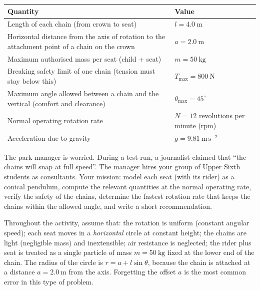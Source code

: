 \documentclass[11pt]{article}
\newcommand{\cle}[1]{{\popxbold\color{popdark}#1}}
\newcounter{popsec}
\newcounter{popsub}
\newcommand{\courssub}[1]{%
  \stepcounter{popsub}%
  \par\vspace{9pt}\noindent{\popxbold\fontsize{11.5}{13}\selectfont\color{popink}{\color{poporange}\thepopsec.\thepopsub}\hspace{6pt}#1}\par\nopagebreak\vspace{4pt}
}
\begin{document}
\begin{center}
\begin{tabularx}{\linewidth}{|l|X|}
\hline
\rowcolor{popblueL} \textbf{Quantity} & \textbf{Value} \\
\hline
Length of each chain (from crown to seat) & $l = 4.0\ \mathrm{m}$ \\
\hline
Horizontal distance from the axis of rotation to the attachment point of a chain on the crown & $a = 2.0\ \mathrm{m}$ \\
\hline
Maximum authorised mass per seat (child + seat) & $m = 50\ \mathrm{kg}$ \\
\hline
Breaking safety limit of one chain (tension must stay below this) & $T_{\max} = 800\ \mathrm{N}$ \\
\hline
Maximum angle allowed between a chain and the vertical (comfort and clearance) & $\theta_{\max} = 45^{\circ}$ \\
\hline
Normal operating rotation rate & $N = 12$ revolutions per minute (rpm) \\
\hline
Acceleration due to gravity & $g = 9.81\ \mathrm{m\,s^{-2}}$ \\
\hline
\end{tabularx}
\end{center}

The park manager is worried. During a test run, a journalist claimed that ``the chains will snap at full speed''. The manager hires your group of Upper Sixth students as consultants. Your mission: model each seat (with its rider) as a \cle{conical pendulum}, compute the relevant quantities at the normal operating rate, verify the safety of the chains, determine the fastest rotation rate that keeps the chains within the allowed angle, and write a short recommendation.

\begin{attention}
Throughout the activity, assume that: the rotation is uniform (constant angular speed); each seat moves in a \emph{horizontal} circle at constant height; the chains are light (negligible mass) and inextensible; air resistance is neglected; the rider plus seat is treated as a single particle of mass $m = 50\ \mathrm{kg}$ fixed at the lower end of the chain. The radius of the circle is $r = a + l\sin\theta$, because the chain is attached at a distance $a = 2.0\ \mathrm{m}$ from the axis. Forgetting the offset $a$ is the most common error in this type of problem.
\end{attention}

\courssub{Tasks}
\end{document}
